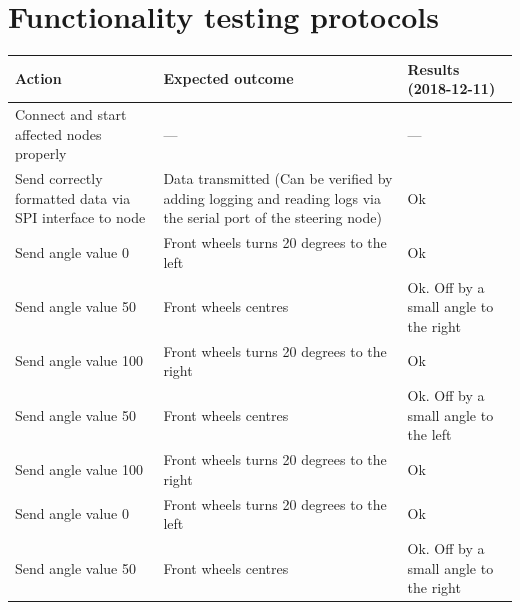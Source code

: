 \documentclass[11pt, titlepage]{article} %
\begin{document}



\clearpage
\clearpage
\appendix

\section{Functionality testing protocols}
\label{appendix:functionalityTesting}

\begin{table}[H]
 \label{tab:title}
\centering
\begin{tabular}{|m{5cm}|m{5cm}|m{5cm}|}
\hline
Action & Expected outcome & Results (2018-12-11) \\ \hline
Connect and start affected nodes properly  &   ---    & ---  \\ \hline
Send correctly formatted data via SPI interface to node  &  Data transmitted (Can be verified by adding logging and reading logs via the serial port of the steering node)      & Ok  \\ \hline
Send angle value 0  & Front wheels turns 20 degrees to the left      & Ok  \\ \hline
Send angle value 50  & Front wheels centres      & Ok. Off by a small angle to the right  \\ \hline
Send angle value 100  & Front wheels turns 20 degrees to the right      & Ok  \\ \hline
Send angle value 50	  & Front wheels centres      & Ok. Off by a small angle to the left  \\ \hline
Send angle value 100	  & Front wheels turns 20 degrees to the right     & Ok  \\ \hline
Send angle value 0	  & Front wheels turns 20 degrees to the left      & Ok  \\ \hline
Send angle value 50	  & Front wheels centres      & Ok. Off by a small angle to the right  \\ \hline

\end{tabular}
\end{table}
\end{document}
